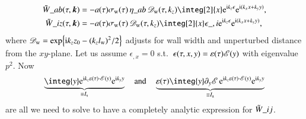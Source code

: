     \begin{equation}\label{eq:pertwalls:gws:Ft_SE_tensor_general}
        \begin{split}
            \Twf\_{ab}(\tau, \vec{k}) &=  -a (\tau)\sigma\ped{w}(\tau)  \, \eta\_{ab} \, \mathscr{D}\ped{w}(\tau,k_z) \integ[2]{x} \eu[\im k_z \epsilon] \eu[\im (k_x x+k_y y)], \\
            \Twf\_{iz}(\tau, \vec{k})
            &= -a (\tau)\sigma\ped{w}(\tau) \,\mathscr{D}\ped{w}(\tau, k_z)  \integ[2]{x} \epsilon\_{,i}  \eu[\im k_z \epsilon] \eu[\im (k_x x+k_y y)],%
         \end{split}
    \end{equation}
    where $\mathscr{D}_\mathrm{w}= \exp{ \ensuremath{\mathrm{i}}k_z z_0-{(k_z l\ensuremath{_\mathrm{w}})}^2/2 }$ adjusts for wall width and unperturbed distance from the $xy$-plane. %
    Let us assume $\epsilon_{,x}=0$ s.t.~$\epsilon(\tau,x,y)=\varepsilon(\tau)\mathscr{E}(y)$ with eigenvalue $p^2$. %
    Now
    \begin{equation}\label{eq:pertwalls:gws:def_I_s_and_a}
        \underbrace{\integ{y} \eu[\im k_z \varepsilon(\tau) \cdot \sppt(y)] \eu[\im k_y y]}_{\equiv  I\ped{s}}  \quad \text{and}\quad %
        \underbrace{\varepsilon(\tau)\integ{y} \partial_y \sppt\, \eu[\im k_z \varepsilon(\tau) \cdot \sppt(y)] \eu[\im k_y y]}_{\equiv I\ped{a}}
    \end{equation}
    are all we need to solve to have a completely analytic expression for $\tilde{W}\_{ij}$.%

